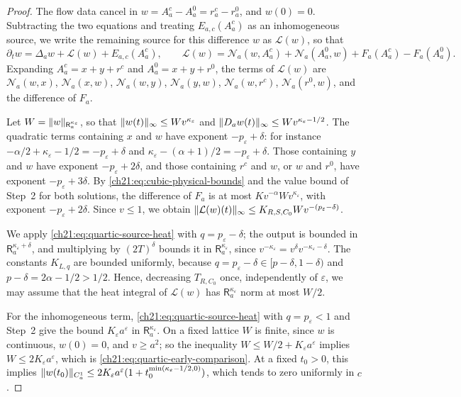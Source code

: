 \begin{proof}
The flow data cancel in $w=A^c_a-A^0_a=r^c_a-r^0_a$, and $w(0)=0$. Subtracting the two equations and treating $E_{a,c}(A^c_a)$ as an inhomogeneous source, we write the remaining source for this difference $w$ as $\mathcal L(w)$, so that
\[
 \partial_tw=\Delta_aw+\mathcal L(w)+E_{a,c}(A^c_a),\qquad
 \mathcal L(w)=\mathcal N_a(w,A^c_a)+\mathcal N_a(A^0_a,w)+F_a(A^c_a)-F_a(A^0_a).
\]
Expanding $A^c_a=x+y+r^c$ and $A^0_a=x+y+r^0$, the terms of $\mathcal L(w)$ are $\mathcal N_a(w,x)$, $\mathcal N_a(x,w)$, $\mathcal N_a(w,y)$, $\mathcal N_a(y,w)$, $\mathcal N_a(w,r^c)$, $\mathcal N_a(r^0,w)$, and the difference of $F_a$.

Let $W=\lVert w\rVert_{\mathsf R_a^{\kappa_\varepsilon}}$, so that $\lVert w(t)\rVert_\infty\le Wv^{\kappa_\varepsilon}$ and $\lVert D_aw(t)\rVert_\infty\le Wv^{\kappa_\varepsilon-1/2}$. The quadratic terms containing $x$ and $w$ have exponent $-p_\varepsilon+\delta$: for instance $-\alpha/2+\kappa_\varepsilon-1/2=-p_\varepsilon+\delta$ and $\kappa_\varepsilon-(\alpha+1)/2=-p_\varepsilon+\delta$. Those containing $y$ and $w$ have exponent $-p_\varepsilon+2\delta$, and those containing $r^c$ and $w$, or $w$ and $r^0$, have exponent $-p_\varepsilon+3\delta$. By \eqref{ch21:eq:cubic-physical-bounds} and the value bound of Step~2 for both solutions, the difference of $F_a$ is at most $Kv^{-\alpha}Wv^{\kappa_\varepsilon}$, with exponent $-p_\varepsilon+2\delta$. Since $v\le1$, we obtain $\lVert \mathcal L(w)(t)\rVert_\infty\le K_{R,S,C_0}Wv^{-(p_\varepsilon-\delta)}$.

We apply \eqref{ch21:eq:quartic-source-heat} with $q=p_\varepsilon-\delta$; the output is bounded in $\mathsf R_a^{\kappa_\varepsilon+\delta}$, and multiplying by $(2T)^\delta$ bounds it in $\mathsf R_a^{\kappa_\varepsilon}$, since $v^{-\kappa_\varepsilon}=v^\delta v^{-\kappa_\varepsilon-\delta}$. The constants $K_{L,q}$ are bounded uniformly, because $q=p_\varepsilon-\delta\in[p-\delta,1-\delta)$ and $p-\delta=2\alpha-1/2>1/2$. Hence, decreasing $T_{R,C_0}$ once, independently of $\varepsilon$, we may assume that the heat integral of $\mathcal L(w)$ has $\mathsf R_a^{\kappa_\varepsilon}$ norm at most $W/2$.

For the inhomogeneous term, \eqref{ch21:eq:quartic-source-heat} with $q=p_\varepsilon<1$ and Step~2 give the bound $K_\varepsilon a^\varepsilon$ in $\mathsf R_a^{\kappa_\varepsilon}$. On a fixed lattice $W$ is finite, since $w$ is continuous, $w(0)=0$, and $v\ge a^2$; so the inequality $W\le W/2+K_\varepsilon a^\varepsilon$ implies $W\le2K_\varepsilon a^\varepsilon$, which is \eqref{ch21:eq:quartic-early-comparison}. At a fixed $t_0>0$, this implies $\lVert w(t_0)\rVert_{C_a^1}\le2K_\varepsilon a^\varepsilon(1+t_0^{\min(\kappa_\varepsilon-1/2,0)})$, which tends to zero uniformly in $c$.


\end{proof}

